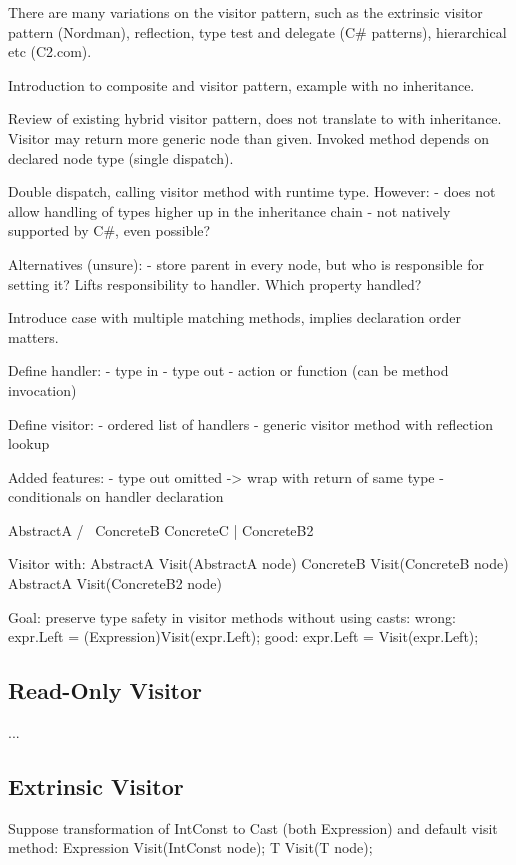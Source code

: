 \documentclass[twoside,openright]{uva-bachelor-thesis}
\begin{document}
		There are many variations on the visitor pattern, such as the extrinsic visitor pattern (Nordman), reflection, type test and delegate (C\# patterns), hierarchical etc (C2.com).
				
		Introduction to composite and visitor pattern, example with no inheritance.
		
		Review of existing hybrid visitor pattern, does not translate to with inheritance. Visitor may return more generic node than given. Invoked method depends on declared node type (single dispatch).
		
		Double dispatch, calling visitor method with runtime type. However:
		- does not allow handling of types higher up in the inheritance chain
		- not natively supported by C\#, even possible?
		
		Alternatives (unsure):
		- store parent in every node, but who is responsible for setting it? Lifts responsibility to handler. Which property handled?
		
		Introduce case with multiple matching methods, implies declaration order matters.
		
		Define handler:
		- type in
		- type out
		- action or function (can be method invocation)
		
		Define visitor:
		- ordered list of handlers
		- generic visitor method with reflection lookup
		
		Added features:
		- type out omitted -> wrap with return of same type
		- conditionals on handler declaration
		
		AbstractA
		/      \
		ConcreteB	ConcreteC
		|
		ConcreteB2
		
		Visitor with:
		AbstractA Visit(AbstractA node)
		ConcreteB Visit(ConcreteB node)
		AbstractA Visit(ConcreteB2 node)
		
		Goal: preserve type safety in visitor methods without using casts:
		wrong:	expr.Left = (Expression)Visit(expr.Left);
		good:	expr.Left = Visit(expr.Left);
			
		
		\subsection{Read-Only Visitor}
			...
			
		\subsection{Extrinsic Visitor}
			Suppose transformation of IntConst to Cast (both Expression) and default visit method:
			Expression Visit(IntConst node);
			T Visit(T node);
			
\end{document}
